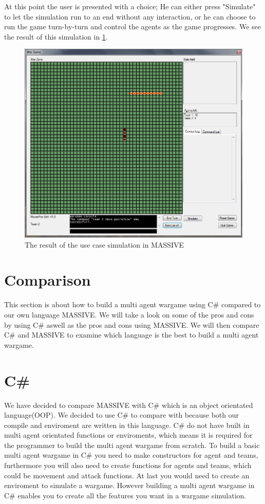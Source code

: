 At this point the user is presented with a choice; He can either press "Simulate" to let the simulation run to an end without any interaction, or he can choose to run the game turn-by-turn and control the agents as the game progresses. We see the result of this simulation in \ref{fig:winner}.

\begin{figure}%
\begin{center}
\includegraphics[scale=0.6]{Images/massive_patrollow.png}%
\end{center}
\caption{The result of the use case simulation in MASSIVE}%
\label{fig:winner}%
\end{figure}

\section{Comparison}
\indent This section is about how to build a multi agent wargame using C\# compared to our own language MASSIVE. We will take a look on some of the pros and cons by using C\#  aswell as the pros and cons using MASSIVE. We will then compare C\# and MASSIVE to examine which language is the best to build a multi agent wargame.

\section{C\#}
We have decided to compare MASSIVE with C\# which is an object orientated language(OOP). We decided to use C\# to compare with because both our compile and enviroment are written in this language. C\# do not have built in multi agent orientated functions or enviroments, which means it is required for the programmer to build the multi agent wargame from scratch. To build a basic multi agent wargame in C\# you need to make constructors for agent and teams, furthermore you will also need to create functions for agents and teams, which could be movement and attack functions. At last you would need to create an enviroment to simulate a wargame. However building a multi agent wargame in C\# enables you to create all the features you want in a wargame simulation.\\

